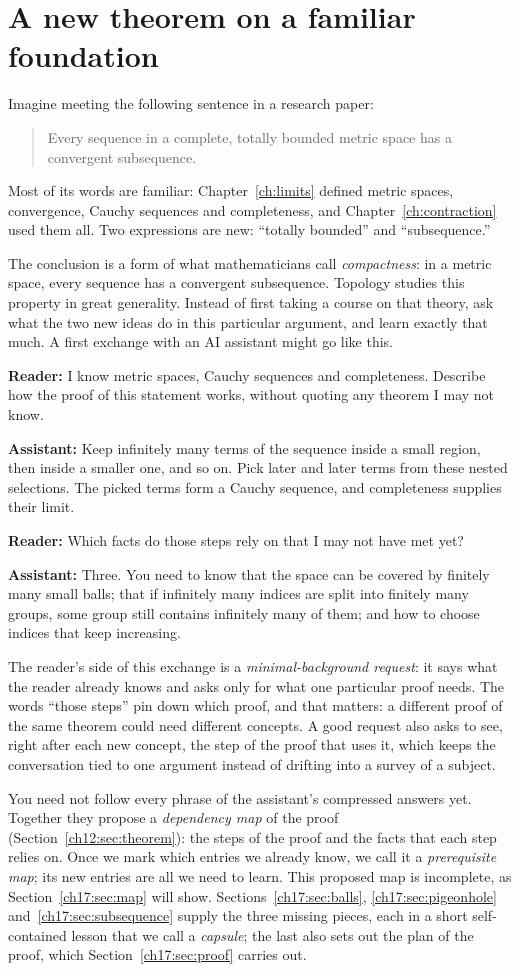 \section{A new theorem on a familiar foundation}\label{ch17:sec:start}
Imagine meeting the following sentence in a research paper:
\begin{quote}
Every sequence in a complete, totally bounded metric space has a convergent subsequence.
\end{quote}
Most of its words are familiar: Chapter~\ref{ch:limits} defined metric spaces, convergence, Cauchy sequences and completeness, and Chapter~\ref{ch:contraction} used them all. Two expressions are new: ``totally bounded'' and ``subsequence.''

The conclusion is a form of what mathematicians call \emph{compactness}: in a metric space, every sequence has a convergent subsequence. Topology studies this property in great generality. Instead of first taking a course on that theory, ask what the two new ideas do in this particular argument, and learn exactly that much. A first exchange with an AI assistant might go like this.

\textbf{Reader:} I know metric spaces, Cauchy sequences and completeness. Describe how the proof of this statement works, without quoting any theorem I may not know.

\textbf{Assistant:} Keep infinitely many terms of the sequence inside a small region, then inside a smaller one, and so on. Pick later and later terms from these nested selections. The picked terms form a Cauchy sequence, and completeness supplies their limit.

\textbf{Reader:} Which facts do those steps rely on that I may not have met yet?

\textbf{Assistant:} Three. You need to know that the space can be covered by finitely many small balls; that if infinitely many indices are split into finitely many groups, some group still contains infinitely many of them; and how to choose indices that keep increasing.

The reader's side of this exchange is a \emph{minimal-background request}: it says what the reader already knows and asks only for what one particular proof needs. The words ``those steps'' pin down which proof, and that matters: a different proof of the same theorem could need different concepts. A good request also asks to see, right after each new concept, the step of the proof that uses it, which keeps the conversation tied to one argument instead of drifting into a survey of a subject.

You need not follow every phrase of the assistant's compressed answers yet. Together they propose a \emph{dependency map} of the proof (Section~\ref{ch12:sec:theorem}): the steps of the proof and the facts that each step relies on. Once we mark which entries we already know, we call it a \emph{prerequisite map}; its new entries are all we need to learn. This proposed map is incomplete, as Section~\ref{ch17:sec:map} will show. Sections~\ref{ch17:sec:balls}, \ref{ch17:sec:pigeonhole} and~\ref{ch17:sec:subsequence} supply the three missing pieces, each in a short self-contained lesson that we call a \emph{capsule}; the last also sets out the plan of the proof, which Section~\ref{ch17:sec:proof} carries out.
